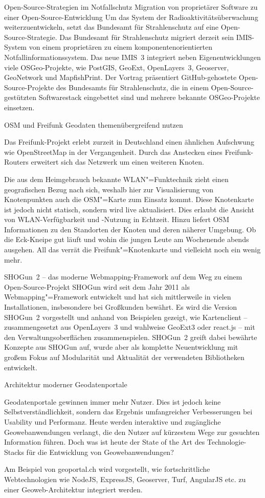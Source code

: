 %
{Open-Source-Strategien im Notfallschutz}%
{Migration von proprietärer Software zu einer Open-Source-Entwicklung}%
{Um das System der Radioaktivitätsüberwachung weiterzuentwickeln, setzt das Bundesamt für
Strahlenschutz auf eine Open-Source-Strategie. Das Bundesamt für Strahlenschutz migriert derzeit sein IMIS-System von
einem proprietären zu einem komponentenorientierten Notfallinformationssystem. Das neue IMIS~3
integriert neben Eigenentwicklungen viele OSGeo-Projekte, wie PostGIS, GeoExt, OpenLayers~3,
Geoserver, GeoNetwork und MapfishPrint. Der Vortrag präsentiert GitHub-gehostete
Open-Source-Projekte des Bundesamts für Strahlenschutz, die in einem
Open-Source-gestützten Softwarestack eingebettet sind und mehrere bekannte
OSGeo-Projekte einsetzen.}


%
{OSM und Freifunk}%
{Geodaten themenübergreifend nutzen}%
{%
Das Freifunk-Projekt erlebt zurzeit in Deutschland einen ähnlichen Aufschwung
wie OpenStreetMap in der Vergangenheit.
Durch das Anstecken eines Freifunk-Routers erweitert sich das Netzwerk um einen
weiteren Knoten.

Die aus dem
Heimgebrauch bekannte WLAN"=Funktechnik zieht einen
geografischen Bezug nach sich, weshalb hier zur Visualisierung von
Knotenpunkten auch die OSM"=Karte zum Einsatz kommt. Diese Knotenkarte ist jedoch
nicht statisch,
sondern wird live aktualisiert.
Dies erlaubt die Ansicht von WLAN-Verfügbarkeit und -Nutzung
in Echtzeit.
Hinzu liefert OSM Informationen zu den Standorten der Knoten und
deren näherer Umgebung. Ob die
Eck-Kneipe gut läuft und wohin die jungen Leute am Wochenende abends ausgehen.
All das verrät die
Freifunk"=Knotenkarte und vielleicht noch ein wenig mehr.}

%
{SHOGun~2 -- das moderne Webmapping-Framework}%
{auf dem Weg zu einem Open-Source-Projekt}%
{SHOGun wird seit dem Jahr 2011 als Webmapping"=Framework entwickelt und hat sich mittlerweile in
  vielen Installationen, insbesondere bei Großkunden bewährt.  Es wird die Version SHOGun~2
  vorgestellt und anhand von Beispielen gezeigt, wie Kartenclient --
zusammengesetzt aus OpenLayers~3 und wahlweise GeoExt3 oder react.js -- mit den
Verwaltungsoberflächen zusammenspielen.  SHOGun~2 greift dabei bewährte Konzepte aus SHOGun auf,
wurde aber als komplette Neuentwicklung mit großem Fokus auf Modularität und Aktualität der
verwendeten Bibliotheken entwickelt.}


%
{Architektur moderner \mbox{Geodatenportale}}%
{}%
{Geodatenportale gewinnen immer mehr Nutzer. Dies ist jedoch keine Selbstverständlichkeit, sondern
das Ergebnis umfangreicher Verbesserungen bei Usability und Performanz. Heute werden interaktive und
zugängliche Geowebanwendungen verlangt, die den Nutzer auf kürzestem Wege zur gesuchten Information
führen. Doch was ist heute der State of the Art des Technologie-Stacks für die Entwicklung von
Geowebanwendungen?

Am Beispiel von geoportal.ch wird vorgestellt, wie fortschrittliche
Webtechnologien wie NodeJS, ExpressJS, Geoserver, Turf, AngularJS etc. zu einer Geoweb-Architektur
integriert werden.}

